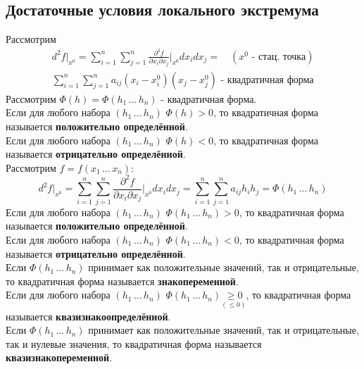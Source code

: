 \documentclass[12pt]{article}
\begin{document}
    \subsection{Достаточные условия локального экстремума}\noindent
    Рассмотрим
    \begin{gather*}
        d^2 f \Big|_{x^0} = \sum_{i=1}^{n}\sum_{j=1}^{n} \frac{\partial^2 f}{\partial x_i \partial x_j} \Big|_{x^0} dx_i dx_j = \quad (x^0 \text{ - стац. точка})\\
        \sum_{i=1}^{n}\sum_{j=1}^{n}a_{ij}(x_i - x^0_i)(x_j - x^0_j) \text{ - квадратичная форма}
    \end{gather*}
    Рассмотрим $\Phi (h) = \Phi (h_1\, \dots\, h_n)$ - квадратичная форма.\\
    Если для любого набора $(h_1\, \dots\, h_n)$ $\Phi(h) > 0$, то квадратичная форма называется \textbf{положительно определённой}.\\
    Если для любого набора $(h_1\, \dots\, h_n)$ $\Phi(h) < 0$, то квадратичная форма называется \textbf{отрицательно определённой}.\\
    Рассмотрим $f = f(x_1\, \dots\, x_n)$:
    \[ d^2 f \Big|_{x^0} = \sum_{i=1}^{n}\sum_{j=1}^{n} \frac{\partial^2 f}{\partial x_i \partial x_j} \Big|_{x^0} dx_i dx_j = \sum_{i=1}^{n}\sum_{j=1}^{n}a_{ij}h_ih_j = \Phi(h_1\, \dots\, h_n) \]
    Если для любого набора $(h_1\, \dots\, h_n)$ $\Phi(h_1\, \dots\, h_n) > 0$, то квадратичная форма называется \textbf{положительно определённой}.\\
    Если для любого набора $(h_1\, \dots\, h_n)$ $\Phi(h_1\, \dots\, h_n) < 0$, то квадратичная форма называется \textbf{отрицательно определённой}.\\
    Если $\Phi(h_1\, \dots\, h_n)$ принимает как положительные значений, так и отрицательные, то квадратичная форма называется \textbf{знакопеременной}.\\
    Если для любого набора $(h_1\, \dots\, h_n)$ $\Phi(h_1\, \dots\, h_n) \underset{(\le 0)}{\ge 0}$, то квадратичная форма называется \textbf{квазизнакоопределённой}.\\
    Если $\Phi(h_1\, \dots\, h_n)$ принимает как положительные значений, так и отрицательные, так и нулевые значения, то квадратичная форма называется \textbf{квазизнакопеременной}.
\end{document}
